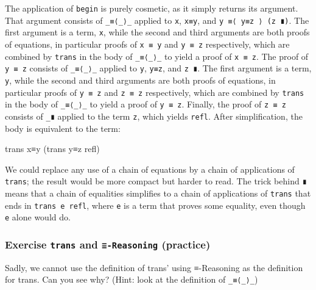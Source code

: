 The application of \texttt{begin} is purely cosmetic, as it simply
returns its argument. That argument consists of \texttt{\_≡⟨\_⟩\_}
applied to \texttt{x}, \texttt{x≡y}, and \texttt{y\ ≡⟨\ y≡z\ ⟩\ (z\ ∎)}.
The first argument is a term, \texttt{x}, while the second and third
arguments are both proofs of equations, in particular proofs of
\texttt{x\ ≡\ y} and \texttt{y\ ≡\ z} respectively, which are combined
by \texttt{trans} in the body of \texttt{\_≡⟨\_⟩\_} to yield a proof of
\texttt{x\ ≡\ z}. The proof of \texttt{y\ ≡\ z} consists of
\texttt{\_≡⟨\_⟩\_} applied to \texttt{y}, \texttt{y≡z}, and
\texttt{z\ ∎}. The first argument is a term, \texttt{y}, while the
second and third arguments are both proofs of equations, in particular
proofs of \texttt{y\ ≡\ z} and \texttt{z\ ≡\ z} respectively, which are
combined by \texttt{trans} in the body of \texttt{\_≡⟨\_⟩\_} to yield a
proof of \texttt{y\ ≡\ z}. Finally, the proof of \texttt{z\ ≡\ z}
consists of \texttt{\_∎} applied to the term \texttt{z}, which yields
\texttt{refl}. After simplification, the body is equivalent to the term:

\begin{myDisplay}
trans x≡y (trans y≡z refl)
\end{myDisplay}

We could replace any use of a chain of equations by a chain of
applications of \texttt{trans}; the result would be more compact but
harder to read. The trick behind \texttt{∎} means that a chain of
equalities simplifies to a chain of applications of \texttt{trans} that
ends in \texttt{trans\ e\ refl}, where \texttt{e} is a term that proves
some equality, even though \texttt{e} alone would do.

\hypertarget{exercise-trans-and--reasoning-practice}{%
\subsubsection{\texorpdfstring{Exercise \texttt{trans} and
\texttt{≡-Reasoning}
(practice)}{Exercise trans and ≡-Reasoning (practice)}}\label{exercise-trans-and--reasoning-practice}}

Sadly, we cannot use the definition of trans' using ≡-Reasoning as the
definition for trans. Can you see why? (Hint: look at the definition of
\texttt{\_≡⟨\_⟩\_})

\begin{fence}
\begin{code}%
\>[0]\<%
\end{code}
\end{fence}

